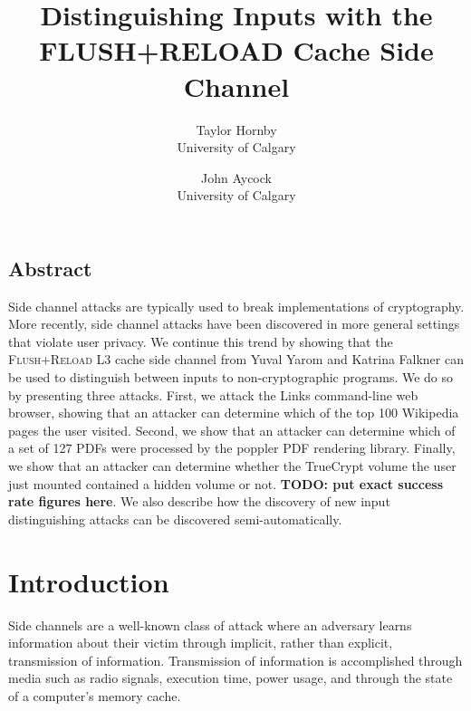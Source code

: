 \documentclass[letterpaper,twocolumn,10pt]{article}
\begin{document}
\date{}

\title{\Large \bf Distinguishing Inputs with the FLUSH+RELOAD Cache Side Channel}

\author{
{\rm Taylor Hornby}\\
University of Calgary
\and
{\rm John Aycock}\\
University of Calgary
} %

\maketitle

\thispagestyle{empty}


\subsection*{Abstract}
Side channel attacks are typically used to break implementations of
cryptography. More recently, side channel attacks have been discovered in more
general settings that violate user privacy. We continue this trend by showing
that the \textsc{Flush+Reload} L3 cache side channel from Yuval Yarom and
Katrina Falkner \cite{yarom2013flush} can be used to distinguish between inputs
to non-cryptographic programs. We do so by presenting three attacks. First, we
attack the Links command-line web browser, showing that an attacker can
determine which of the top 100 Wikipedia pages the user visited. Second, we show
that an attacker can determine which of a set of 127 PDFs were processed by the
poppler PDF rendering library. Finally, we show that an attacker can determine
whether the TrueCrypt volume the user just mounted contained a hidden volume or
not. \textbf{TODO: put exact success rate figures here}. We also describe how
the discovery of new input distinguishing attacks can be discovered
semi-automatically.

\section{Introduction}
\label{sec:intro}

Side channels are a well-known class of attack where an adversary learns
information about their victim through implicit, rather than explicit,
transmission of information. Transmission of information is accomplished through
media such as radio signals, execution time, power usage, and through the state
of a computer's memory cache.
\end{document}
